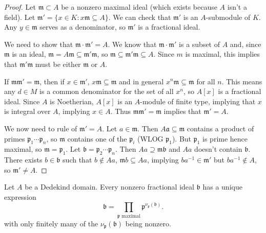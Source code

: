 \documentclass[10pt]{scrartcl}
\providecommand{\inv}{^{-1}}
\providecommand{\mf}[1]{\mathfrak{#1}}
\begin{document}
\begin{proof}
	Let $\mf m\subset A$ be a nonzero maximal ideal
	(which exists because $A$ isn't a field).
	Let $\mf m'=\{x\in K : x\mf m\subseteq A\}$.
	We can check that $\mf m'$ is an $A$-submodule of $K$.
	Any $y\in\mf m$ serves as a denominator, so $\mf m'$ is a fractional ideal.
	
	We need to show that $\mf m\cdot\mf m' = A$. We know that
	$\mf m\cdot\mf m'$ is a subset of $A$ and, since $\mf m$ is an ideal,
	$\mf m = A\mf m\subseteq \mf m'\mf m$, so
	$\mf m\subseteq\mf m'\mf m\subseteq A$.
	Since $m$ is maximal, this implies that $\mf m'\mf m$ must be
	either $\mf m$ or $A$.
	
	If $\mf m\mf m' = \mf m$, then if $x\in\mf m'$, $x\mf m\subseteq \mf m$
	and in general $x^n\mf m\subseteq \mf m$ for all $n$.
	This means any $d\in M$ is a common denominator for the set of all $x^n$,
	so $A[x]$ is a fractional ideal. Since $A$ is Noetherian,
	$A[x]$ is an $A$-module of finite type, implying that
	$x$ is integral over $A$, implying $x\in A$.
	Thus $\mf m\mf m' = \mf m$ implies that $\mf m' = A$.
	
	We now need to rule of $\mf m' = A$.
	Let $a\in \mf m$. Then $A\mf a\subseteq\mf m$ contains a product of primes
	$\mf p_1\cdots\mf p_n$, so $\mf m$ contains one of the $\mf p_i$
	(WLOG $\mf p_1$). But $\mf p_1$ is prime hence maximal,
	so $\mf m = \mf p_1$. Let $\mf b = \mf p_2\cdots\mf p_n$.
	Then $Aa\supseteq\mf{mb}$ and $Aa$ doesn't contain $\mf b$.
	There exists $b\in\mathfrak b$ such that
	$b\notin Aa$, $\mf{m}b\subseteq Aa$, implying $ba\inv\in\mf m'$
	but $ba\inv\notin A$, so $\mf m'\ne A$.
\end{proof}

\begin{theorem}
	Let $A$ be a Dedekind domain.
	Every nonzero fractional ideal $\mf b$ has a unique expression
	\[\mf b = \prod_{\mf p\text{ maximal}}\mf p^{\nu_{\mf p}(\mf b)}.\]
	with only finitely many of the $\nu_{\mf p}(\mf b)$ being nonzero.
\end{theorem}
\end{document}
